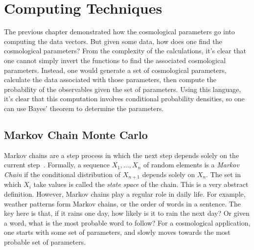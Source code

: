 \chapter{Computing Techniques}
The previous chapter demonstrated how the cosmological parameters go into computing the data vectors. But given some data, how does one find the cosmological parameters? From the complexity of the calculations, it's clear that one cannot simply invert the functions to find the associated cosmological parameters. Instead, one would generate a set of cosmological parameters, calculate the data associated with those parameters, then compute the probability of the observables given the set of parameters. Using this language, it's clear that this computation involves conditional probability densities, so one can use Bayes' theorem to determine the parameters.

\section{Markov Chain Monte Carlo}
Markov chains are a step process in which the next step depends solely on the current step~\cite{agrahari_monte_2021}. Formally, a
sequence $X_1,\hdots,X_n$ of random elements is a \textit{Markov Chain} if the conditional distribution  of $X_{n+1}$ depends solely on $X_n$. The set in which $X_i$ take values is called the \textit{state space} of the chain. This is a very abstract definition. However, Markov chains play a regular role in daily life. For example, weather patterns form Markov chains, or the order of words in a sentence. The key here is that, if it rains one day, how likely is it to rain the next day? Or given a word, what is the most probable word to follow? For a cosmological application, one starts with some set of parameters, and slowly moves towards the most probable set of parameters.

